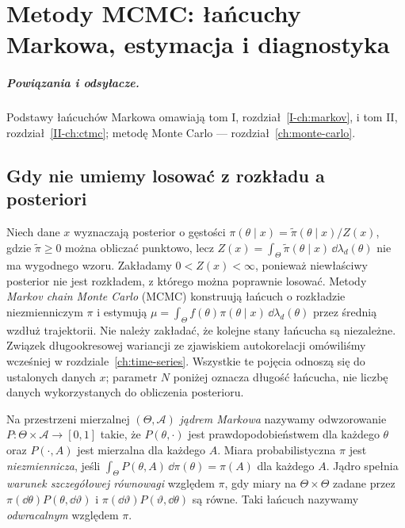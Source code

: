 \chapter{Metody MCMC: łańcuchy Markowa, estymacja i diagnostyka}
\label{ch:mcmc}
\paragraph{Powiązania i odsyłacze.} Podstawy łańcuchów Markowa omawiają tom I, rozdział~\ref{I-ch:markov}, i tom II, rozdział~\ref{II-ch:ctmc}; metodę Monte Carlo — rozdział~\ref{ch:monte-carlo}.


\section{Gdy nie umiemy losować z rozkładu a posteriori}
Niech dane $x$ wyznaczają posterior o gęstości
$\pi(\theta\mid x)=\widetilde\pi(\theta\mid x)/Z(x)$,
gdzie $\widetilde\pi\ge0$ można obliczać punktowo, lecz
$Z(x)=\int_\Theta\widetilde\pi(\theta\mid x)\,
\dd\lambda_d(\theta)$ nie ma wygodnego wzoru.
Zakładamy $0<Z(x)<\infty$, ponieważ niewłaściwy posterior
nie jest rozkładem, z którego można poprawnie losować.
Metody \emph{Markov chain Monte Carlo} (MCMC) konstruują
łańcuch o rozkładzie niezmienniczym $\pi$ i estymują
$\mu=\int_\Theta f(\theta)\pi(\theta\mid x)\,
\dd\lambda_d(\theta)$ przez średnią wzdłuż trajektorii.
Nie należy zakładać, że kolejne stany łańcucha są niezależne.
Związek długookresowej wariancji ze zjawiskiem autokorelacji omówiliśmy wcześniej w rozdziale~\ref{ch:time-series}.
Wszystkie te pojęcia odnoszą się do ustalonych danych $x$;
parametr $N$ poniżej oznacza długość łańcucha, nie liczbę
danych wykorzystanych do obliczenia posterioru.

\begin{definicja}
\label{def:mcmc-kernel}
Na przestrzeni mierzalnej $(\Theta,\mathcal A)$ \emph{jądrem Markowa}
nazywamy odwzorowanie $P\colon\Theta\times\mathcal A\to[0,1]$
takie, że $P(\theta,\cdot)$ jest prawdopodobieństwem dla
każdego $\theta$ oraz $P(\cdot,A)$ jest mierzalna dla każdego $A$.
Miara probabilistyczna $\pi$ jest \emph{niezmiennicza}, jeśli
$\int_\Theta P(\theta,A)\,\dd\pi(\theta)=\pi(A)$ dla każdego $A$.
Jądro spełnia \emph{warunek szczegółowej równowagi} względem $\pi$,
gdy miary na $\Theta\times\Theta$ zadane przez
$\pi(\dd\theta)P(\theta,\dd\vartheta)$ i
$\pi(\dd\vartheta)P(\vartheta,\dd\theta)$ są równe.
Taki łańcuch nazywamy \emph{odwracalnym} względem $\pi$.
\end{definicja}

